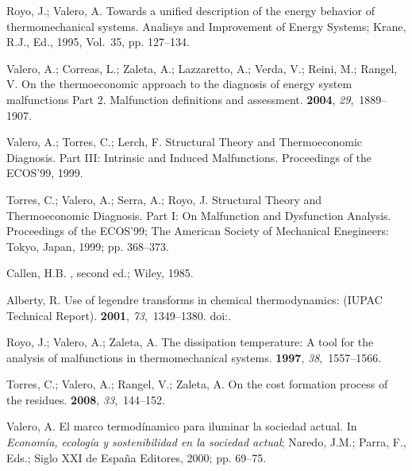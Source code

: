 \documentclass[energies,article,submit,moreauthors,pdftex]{Definitions/mdpi}
\begin{document}
\begin{thebibliography}{-------}
	Royo, J.; Valero, A.
	\newblock Towards a unified description of the energy behavior of
	thermomechanical systems.
	\newblock  Analisys and Improvement of Energy Systems; Krane, R.J., Ed.,  1995,
	Vol.~35, pp. 127--134.

	Valero, A.; Correas, L.; Zaleta, A.; Lazzaretto, A.; Verda, V.; Reini, M.;
	Rangel, V.
	\newblock On the thermoeconomic approach to the diagnosis of energy system
	malfunctions Part 2. Malfunction definitions and assessment.
	 {\bf 2004}, {\em 29},~1889--1907.

	Valero, A.; Torres, C.; Lerch, F.
	\newblock Structural Theory and Thermoeconomic Diagnosis. Part III: Intrinsic
	and Induced Malfunctions.
	\newblock  Proceedings of the ECOS'99,  1999.

	Torres, C.; Valero, A.; Serra, A.; Royo, J.
	\newblock Structural Theory and Thermoeconomic Diagnosis. Part I: On
	Malfunction and Dysfunction Analysis.
	\newblock  Proceedings of the ECOS'99; The American Society of Mechanical
	Enegineers: Tokyo, Japan,  1999; pp. 368--373.

	Callen, H.B.
	,
	second ed.; Wiley,  1985.

	Alberty, R.
	\newblock Use of legendre transforms in chemical thermodynamics: (IUPAC
	Technical Report).
	 {\bf 2001}, {\em 73},~1349--1380.
	\newblock
	doi:{\href{https://doi.org/10.1351/pac200173081349}{}}.

	Royo, J.; Valero, A.; Zaleta, A.
	\newblock The dissipation temperature: A tool for the analysis of malfunctions
	in thermomechanical systems.
	 {\bf 1997}, {\em
		38},~1557--1566.

	Torres, C.; Valero, A.; Rangel, V.; Zaleta, A.
	\newblock On the cost formation process of the residues.
	 {\bf 2008}, {\em 33},~144--152.

	Valero, A.
	\newblock El marco termodínamico para iluminar la sociedad actual. In {\em
		Economía, ecología y sostenibilidad en la sociedad actual}; Naredo, J.M.;
	Parra, F., Eds.; Siglo XXI de España Editores,  2000; pp. 69--75.
\end{thebibliography}
\end{document}
